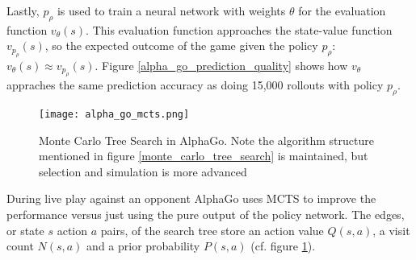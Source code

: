 Lastly, $p_{\rho}$ is used to train a neural network with weights $\theta$ for the evaluation function $v_{\theta}(s)$. This evaluation function approaches the state-value function $v_{p_{\rho}}(s)$, so the expected outcome of the game given the policy $p_{\rho}$: $v_{\theta}(s) \approx v_{p_{\rho}}(s)$. Figure \ref{alpha_go_prediction_quality} shows how $v_{\theta}$ appraches the same prediction accuracy as doing 15,000 rollouts with policy $p_{\rho}$.

\begin{figure}
    \centering
    \texttt{[image: alpha\_go\_mcts.png]}
    \caption{Monte Carlo Tree Search in AlphaGo. \cite{silver_mastering_2016} Note the algorithm structure mentioned in figure \ref{monte_carlo_tree_search} is maintained, but selection and simulation is more advanced}
    \label{alpha_go_mcts}
\end{figure}

During live play against an opponent AlphaGo uses MCTS to improve the performance versus just using the pure output of the policy network. The edges, or state $s$ action $a$ pairs, of the search tree store an action value $Q(s, a)$, a visit count $N(s, a)$ and a prior probability $P(s, a)$ (cf. figure \ref{alpha_go_mcts}).

